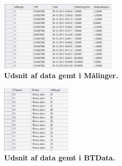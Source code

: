 \begin{figure}[H]
\includegraphics[width =0.5\textwidth , center]{billeder/database_data_gem}
\caption{\textbf{Udsnit af data gemt i Målinger.}}
\end{figure}
\begin{figure}[H]
\includegraphics[width =0.3\textwidth , center]{billeder/database_bt_gem}
\caption{\textbf{Udsnit af data gemt i BTData.}}
\end{figure}

